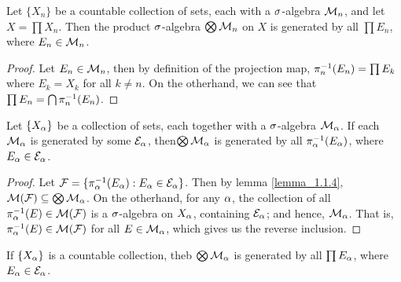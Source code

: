 \begin{lemma}\label{lemma_1.1.6}
    Let $\{X_n\}$ be a countable collection of sets, each with a $\sigma$-algebra
    $\mathcal{M}_n$, and let $X=\prod{X_n}$. Then the product $\sigma$-algebra
    $\bigotimes{\mathcal{M}_n}$ on $X$ is generated by all $\prod{E_n}$, where $E_n \in
    \mathcal{M}_n$.
\end{lemma}
\begin{proof}
    Let $E_n \in \mathcal{M}_n$, then by definition of the projection map,
    $\pi_n^{-1}(E_n)=\prod{E_k}$ where $E_k=X_k$ for all  $k \neq n$. On the
    otherhand, we can see that $\prod{E_n}=\bigcap{\pi_n^{-1}(E_n)}$.
\end{proof}

\begin{lemma}
    Let $\{X_\alpha\}$ be a collection of sets, each together with a $\sigma$-algebra
    $\mathcal{M}_\alpha$. If each $\mathcal{M}_\alpha$ is generated by some $\mathcal{E}_\alpha$,
    then$\bigotimes{\mathcal{M}_\alpha}$ is generated by all $\pi_\alpha^{-1}(E_\alpha)$, where
    $E_\alpha \in \mathcal{E}_\alpha$.
\end{lemma}
\begin{proof}
    Let $\mathcal{F}=\{\pi_\alpha^{-1}(E_\alpha) : E_\alpha \in \mathcal{E}_\alpha\}$. Then by lemma
    \ref{lemma_1.1.4}, $\mathcal{M}(\mathcal{F}) \subseteq \bigotimes{\mathcal{M}_\alpha}$. On the
    otherhand, for any $\alpha$, the collection of all $\pi_\alpha^{-1}(E) \in
    \mathcal{M}(\mathcal{F})$ is a $\sigma$-algebra on $X_\alpha$, containing $\mathcal{E}_\alpha$; and hence,
    $\mathcal{M}_\alpha$. That is, $\pi_\alpha^{-1}(E) \in \mathcal{M}(\mathcal{F})$ for all $E \in \mathcal{M}_\alpha$,
    which gives us the reverse inclusion.
\end{proof}
\begin{corollary}
    If $\{X_\alpha\}$ is a countable collection, theb $\bigotimes{\mathcal{M}_\alpha}$ is
    generated by all $\prod{E_\alpha}$, where $E_\alpha \in \mathcal{E}_\alpha$.
\end{corollary}

